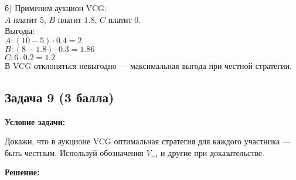 \documentclass[a4paper,12pt]{article}
\begin{document}
\item[б)] Применим аукцион VCG:\\
\(A\) платит \(5\), \(B\) платит \(1.8\), \(C\) платит \(0\).\\
Выгоды:\\
\(A: (10-5)\cdot 0.4 = 2\)\\
\(B: (8-1.8)\cdot 0.3 = 1.86\)\\
\(C: 6 \cdot 0.2 = 1.2\)\\
В VCG отклоняться невыгодно — максимальная выгода при честной стратегии. 

\vspace{1cm}

\subsection{Задача 9 (3 балла)}
\textbf{Условие задачи:}

Докажи, что в аукционе VCG оптимальная стратегия для каждого участника — быть честным. Используй обозначения $V_{-i}$ и другие при доказательстве.

\textbf{Решение:}


\vspace{1cm}
\end{document}
